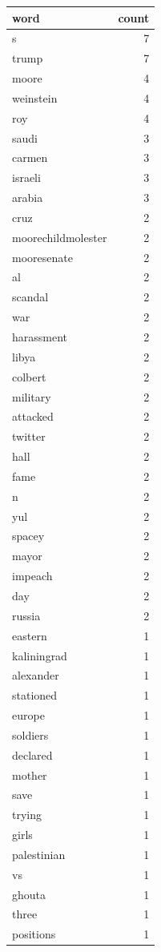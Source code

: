 \begin{tabular}{lr}
\toprule
word & count \\
\midrule
s & 7 \\
trump & 7 \\
moore & 4 \\
weinstein & 4 \\
roy & 4 \\
saudi & 3 \\
carmen & 3 \\
israeli & 3 \\
arabia & 3 \\
cruz & 2 \\
moorechildmolester & 2 \\
mooresenate & 2 \\
al & 2 \\
scandal & 2 \\
war & 2 \\
harassment & 2 \\
libya & 2 \\
colbert & 2 \\
military & 2 \\
attacked & 2 \\
twitter & 2 \\
hall & 2 \\
fame & 2 \\
n & 2 \\
yul & 2 \\
spacey & 2 \\
mayor & 2 \\
impeach & 2 \\
day & 2 \\
russia & 2 \\
eastern & 1 \\
kaliningrad & 1 \\
alexander & 1 \\
stationed & 1 \\
europe & 1 \\
soldiers & 1 \\
declared & 1 \\
mother & 1 \\
save & 1 \\
trying & 1 \\
girls & 1 \\
palestinian & 1 \\
vs & 1 \\
ghouta & 1 \\
three & 1 \\
positions & 1 \\

\end{tabular}
